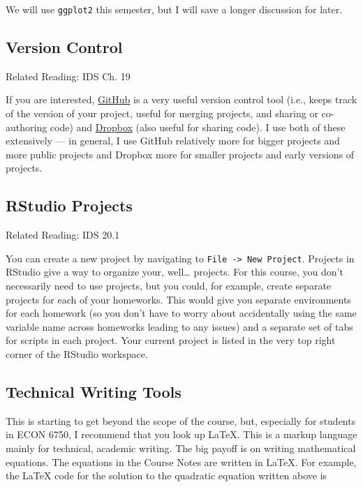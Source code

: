 \documentclass[
  letterpaper,
  DIV=11,
  numbers=noendperiod]{scrreprt}
\begin{document}
We will use \texttt{ggplot2} this semester, but I will save a longer
discussion for later.

\subsection{Version Control}\label{version-control}

Related Reading: IDS Ch. 19

If you are interested, \href{http://github.com}{GitHub} is a very useful
version control tool (i.e., keeps track of the version of your project,
useful for merging projects, and sharing or co-authoring code) and
\href{http://dropbox.com}{Dropbox} (also useful for sharing code). I use
both of these extensively --- in general, I use GitHub relatively more
for bigger projects and more public projects and Dropbox more for
smaller projects and early versions of projects.

\subsection{RStudio Projects}\label{rstudio-projects}

Related Reading: IDS 20.1

You can create a new project by navigating to
\texttt{File\ -\textgreater{}\ New\ Project}. Projects in RStudio give a
way to organize your, well\ldots{} projects. For this course, you don't
necessarily need to use projects, but you could, for example, create
separate projects for each of your homeworks. This would give you
separate environments for each homework (so you don't have to worry
about accidentally using the same variable name across homeworks leading
to any issues) and a separate set of tabs for scripts in each project.
Your current project is listed in the very top right corner of the
RStudio workspace.

\subsection{Technical Writing Tools}\label{technical-writing-tools}

This is starting to get beyond the scope of the course, but, especially
for students in ECON 6750, I recommend that you look up LaTeX. This is a
markup language mainly for technical, academic writing. The big payoff
is on writing mathematical equations. The equations in the Course Notes
are written in LaTeX. For example, the LaTeX code for the solution to
the quadratic equation written above is
\end{document}
